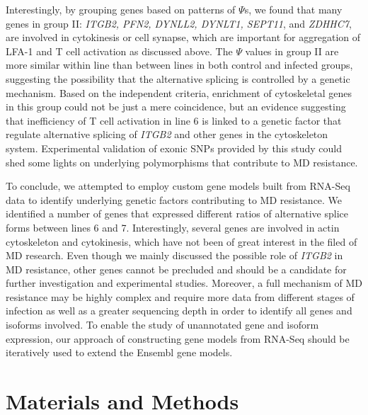 \documentclass[10pt]{article}
\begin{document}
Interestingly, by grouping genes based on patterns of $\Psi$s, we found that
many genes in group II: {\em ITGB2, PFN2, DYNLL2, DYNLT1, SEPT11}, and {\em
ZDHHC7}, are involved in cytokinesis or cell synapse, which are important for
aggregation of LFA-1 and T cell activation as discussed above.  The $\Psi$
values in group II are more similar within line than between lines in both
control and infected groups, suggesting the possibility that the alternative
splicing is controlled by a genetic mechanism.  Based on the independent
criteria, enrichment of cytoskeletal genes in this group could not be just a
mere coincidence, but an evidence suggesting that inefficiency of T cell
activation in line 6 is linked to a genetic factor that regulate alternative
splicing of {\em ITGB2} and other genes in the cytoskeleton system.
Experimental validation of exonic SNPs provided by this study could shed some
lights on underlying polymorphisms that contribute to MD resistance.

To conclude, we attempted to employ custom gene models built from RNA-Seq data
to identify underlying genetic factors contributing to MD resistance.  We
identified a number of genes that expressed different ratios of alternative
splice forms between lines 6 and 7.  Interestingly, several genes are involved
in actin cytoskeleton and cytokinesis, which have not been of great interest in
the filed of MD research.  Even though we mainly discussed the possible role of
{\em ITGB2} in MD resistance, other genes cannot be precluded and should be a
candidate for further investigation and experimental studies.  Moreover, a full
mechanism of MD resistance may be highly complex and require more data from
different stages of infection as well as a greater sequencing depth in order to
identify all genes and isoforms involved.  To enable the study of unannotated
gene and isoform expression, our approach of constructing gene models from
RNA-Seq should be iteratively used to extend the Ensembl gene models.


\section*{Materials and Methods}
\end{document}
